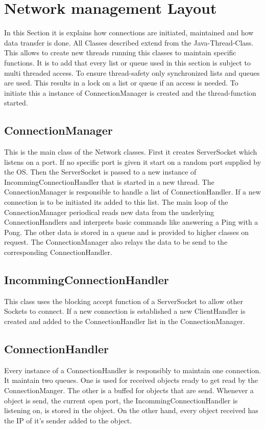
\section{Network management Layout}
In this Section it is explains how connections are initiated, maintained and how data transfer is done. All Classes described extend from the Java-Thread-Class. This allows to create new threads running this classes to maintain specific functions. It is to add that every list or queue used in this section is subject to multi threaded access. To ensure thread-safety only synchronized lists and queues are used. This results in a lock on a list or queue if an access is needed.
To initiate this a instance of ConnectionManager is created and the thread-function started.

\subsection{ConnectionManager}
This is the main class of the Network classes. First it creates ServerSocket which listens on a port. If no specific port is given it start on a random port supplied by the OS. Then the ServerSocket is passed to a new instance of IncommingConnectionHandler that is started in a new thread. The ConnectionManager is responsible to handle a list of ConnectionHandler. If a new connection is to be initiated its added to this list. The main loop of the ConnectionManager periodical reads new data from the underlying ConnectionHandlers and interprets basic commands like answering a Ping with a Pong. The other data is stored in a queue and is provided to higher classes on request. The ConnectionManager also relays the data to be send to the corresponding ConnectionHandler. 

\subsection{IncommingConnectionHandler}
This class uses the blocking accept function of a ServerSocket to allow other Sockets to connect. If a new connection is established a new ClientHandler is created and added to the ConnectionHandler list in the ConnectionManager.

\subsection{ConnectionHandler}
Every instance of a ConnectionHandler is responsibly to maintain one connection. It maintain two queues. One is used for received objects ready to get read by the ConnectionManger. The other is a buffed for objects that are send. 
Whenever a object is send, the current open port, the IncommingConnectionHandler is listening on, is stored in the object. On the other hand, every object received has the IP of it's sender added to the object.